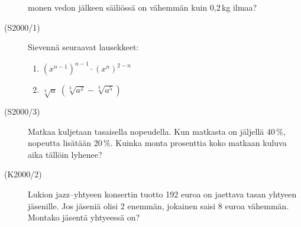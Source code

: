 \begin{description}
                       monen vedon jälkeen säiliössä on vähemmän kuin 0,2\,kg ilmaa?
    \item[(S2000/1)]   Sievennä seuraavat lausekkeet:
        \begin{enumerate}
            \item $ \left( x^{n - 1} \right)^{n - 1} \cdot  \left( x^{n} \right)^{2 - n} $
            \item $ \sqrt[3]{a} \; ( \sqrt[3]{a^2} - \sqrt[3]{a^5}) $
        \end{enumerate}
    \item[(S2000/3)]   Matkaa kuljetaan tasaisella nopeudella. Kun matkasta on jäljellä 40\,\%, nopeutta lisätään 20\,\%.
                       Kuinka monta prosenttia koko matkaan kuluva aika tällöin lyhenee?
    \item[(K2000/2)]   Lukion jazz--yhtyeen konsertin tuotto 192 euroa on jaettava tasan yhtyeen jäsenille. Jos jäseniä olisi 2
                       enemmän, jokainen saisi 8 euroa vähemmän. Montako jäsentä yhtyeessä on?

\end{description}